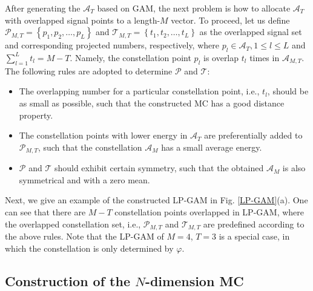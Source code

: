 \documentclass[journal]{IEEEtran}
\begin{document}
After generating  the $\mathcal A _{T}$ based on GAM,  the next problem is  how to allocate  $\mathcal A _{T}$ with  overlapped signal points to a length-$M$ vector.     To proceed, let us define $\mathcal P_{M,T}= \left\{ p_1, p_2, \dots, p_L \right\}$ and $\mathcal T_{M,T}= \left\{ t_1, t_2, \dots, t_L \right\}$  as the overlapped signal set and corresponding   projected  numbers, respectively, where $p_l \in \mathcal A _{T}, 1\leq l \leq L$ and $ \sum\nolimits_{l=1}^{L}  t_l=M-T$. Namely, the constellation point $p_l$ is overlap $t_l$ times in $\mathcal A _{{M,T}}$.
The following rules are adopted to determine   $\mathcal P$ and  $\mathcal T$:

\begin{itemize}
 \item The   overlapping  number for a particular constellation point, i.e., $t_l$,   should be as small  as possible,  such that the constructed MC has a good distance property. 
 
 \item  The constellation points with lower energy in $\mathcal A _{T}$ are preferentially     added to  $\mathcal P_{M,T}$, such that the constellation $\mathcal A _{{M}}$  has a small average energy.
 
  \item     $ \mathcal P $ and   $\mathcal T $ should exhibit certain symmetry,  such that the obtained $\mathcal A _{{M}}$ is also symmetrical  and with a zero mean.
\end{itemize}

Next,  we give an example of the  constructed  LP-GAM  in Fig.  \ref{LP-GAM}(a).  One can see that  there are $M-T$ constellation points  overlapped in LP-GAM,  where the overlapped constellation set, i.e.,  $\mathcal P_{M,T}$ and $\mathcal T_{M,T}$  are predefined according to the above rules. Note that the LP-GAM of $M=4$, $T=3$ is  a special case, in which the  constellation is only determined by    $\varphi$. 

 

\subsection{ Construction of  the $N$-dimension MC}
\end{document}
